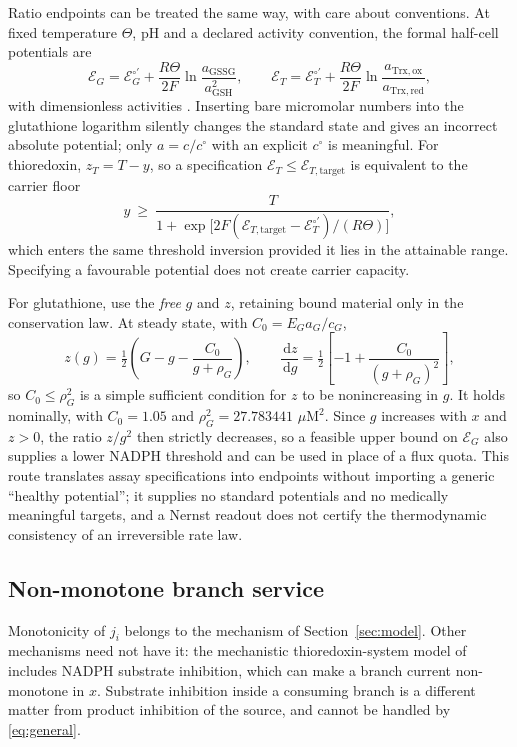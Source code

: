 \documentclass[11pt,a4paper]{article}
\theoremstyle{plain}
\theoremstyle{definition}
\theoremstyle{remark}
\newcommand{\uM}{\ensuremath{\mu\mathrm{M}}}
\newcommand{\dd}{\,\mathrm d}
\begin{document}
Ratio endpoints can be treated the same way, with care about conventions. At fixed
temperature $\Theta$, pH and a declared activity convention, the formal half-cell
potentials are
\begin{equation}\label{eq:nernst}
  \mathcal E_G=\mathcal E_G^{\circ\prime}
    +\frac{R\Theta}{2F}\ln\frac{a_{\mathrm{GSSG}}}{a_{\mathrm{GSH}}^2},
  \qquad
  \mathcal E_T=\mathcal E_T^{\circ\prime}
    +\frac{R\Theta}{2F}\ln\frac{a_{\mathrm{Trx,ox}}}{a_{\mathrm{Trx,red}}} ,
\end{equation}
with dimensionless activities \citep{schafer2001}. Inserting bare micromolar
numbers into the glutathione logarithm silently changes the standard state and
gives an incorrect absolute potential; only $a=c/c^\circ$ with an explicit
$c^\circ$ is meaningful. For thioredoxin, $z_T=T-y$, so a specification
$\mathcal E_T\le\mathcal E_{T,\mathrm{target}}$ is equivalent to the carrier floor
\[
  y\ \ge\ \frac{T}{1+\exp\bigl[2F(\mathcal E_{T,\mathrm{target}}
    -\mathcal E_T^{\circ\prime})/(R\Theta)\bigr]} ,
\]
which enters the same threshold inversion provided it lies in the attainable
range. Specifying a favourable potential does not create carrier capacity.

For glutathione, use the \emph{free} $g$ and $z$, retaining bound material only in
the conservation law. At steady state, with $C_0=E_Ga_G/c_G$,
\[
  z(g)=\tfrac12\left(G-g-\frac{C_0}{g+\rho_G}\right),
  \qquad
  \frac{\dd z}{\dd g}=\tfrac12\left[-1+\frac{C_0}{(g+\rho_G)^2}\right],
\]
so $C_0\le\rho_G^2$ is a simple sufficient condition for $z$ to be nonincreasing in
$g$. It holds nominally, with $C_0=1.05$ and $\rho_G^2=27.783441$ $\uM^2$. Since
$g$ increases with $x$ and $z>0$, the ratio $z/g^2$ then strictly decreases, so a
feasible upper bound on $\mathcal E_G$ also supplies a lower NADPH threshold and
can be used in place of a flux quota. This route translates assay specifications
into endpoints without importing a generic ``healthy potential''; it supplies no
standard potentials and no medically meaningful targets, and a Nernst readout does
not certify the thermodynamic consistency of an irreversible rate law.

\subsection{Non-monotone branch service}\label{sec:nonmono}

Monotonicity of $j_i$ belongs to the mechanism of Section~\ref{sec:model}. Other
mechanisms need not have it: the mechanistic thioredoxin-system model of
\citet{pannala2015} includes NADPH substrate inhibition, which can make a branch
current non-monotone in $x$. Substrate inhibition inside a consuming branch is a
different matter from product inhibition of the source, and cannot be handled by
\eqref{eq:general}.
\end{document}
